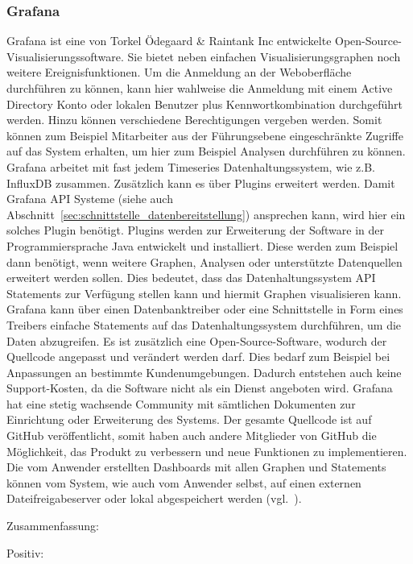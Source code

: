 \subsubsection{Grafana}
\label{subsubsec:grafana}
Grafana ist eine von Torkel Ödegaard \& Raintank Inc entwickelte
Open\hyp{}Source\hyp{}Visualisierungssoftware. Sie bietet neben einfachen
Visualisierungsgraphen noch weitere Ereignisfunktionen. Um die Anmeldung an der
Weboberfläche durchführen zu können, kann hier wahlweise die Anmeldung mit
einem \gls{Active Directory} Konto oder lokalen Benutzer plus
Kennwortkombination durchgeführt werden. Hinzu können verschiedene
Berechtigungen vergeben werden. Somit können zum Beispiel Mitarbeiter aus der
Führungsebene eingeschränkte Zugriffe auf das System erhalten, um hier zum
Beispiel Analysen durchführen zu können. Grafana arbeitet mit fast jedem
Timeseries Datenhaltungssystem, wie z.B. InfluxDB zusammen. Zusätzlich kann es
über Plugins erweitert werden. Damit Grafana API Systeme (siehe auch
Abschnitt~\ref{sec:schnittstelle_datenbereitstellung}) ansprechen kann, wird
hier ein solches Plugin benötigt. Plugins werden zur Erweiterung der Software
in der Programmiersprache Java entwickelt und installiert. Diese werden zum
Beispiel dann benötigt, wenn weitere Graphen, Analysen oder unterstützte
Datenquellen erweitert werden sollen. Dies bedeutet, dass das
Datenhaltungssystem API Statements zur Verfügung stellen kann und hiermit
Graphen visualisieren kann. Grafana kann über einen \gls{Datenbanktreiber} oder
eine Schnittstelle in Form eines Treibers einfache Statements auf das
Datenhaltungssystem durchführen, um die Daten abzugreifen. Es ist zusätzlich
eine Open\hyp{}Source\hyp{}Software, wodurch der Quellcode angepasst und
verändert werden darf. Dies bedarf zum Beispiel bei Anpassungen an bestimmte
Kundenumgebungen.  Dadurch entstehen auch keine Support\hyp{}Kosten, da die
Software nicht als ein Dienst angeboten wird. Grafana hat eine stetig wachsende
Community mit sämtlichen Dokumenten zur Einrichtung oder Erweiterung des
Systems. Der gesamte Quellcode ist auf GitHub veröffentlicht, somit haben auch
andere Mitglieder von GitHub die Möglichkeit, das Produkt zu verbessern und
neue Funktionen zu implementieren. Die vom Anwender erstellten Dashboards mit
allen Graphen und Statements können vom System, wie auch vom Anwender selbst,
auf einen externen Dateifreigabeserver oder lokal abgespeichert werden
(vgl.~\cite{grafana}).

Zusammenfassung:

Positiv:

